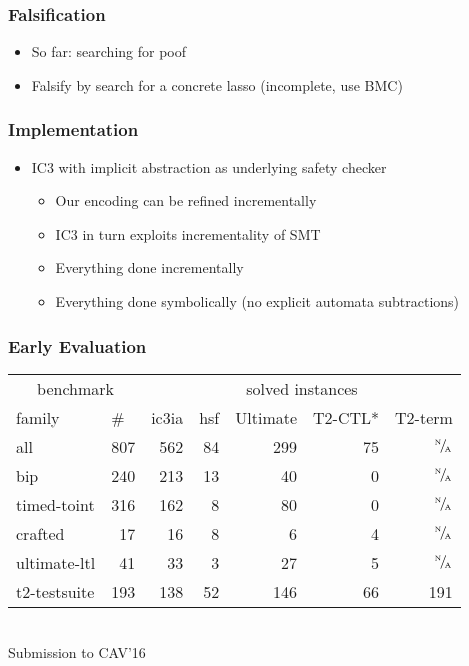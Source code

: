 \documentclass[d3s,tikz]{beamer}
\begin{document}
\subtitleframe{}
\begin{frame}
\frametitle{Falsification}
\begin{itemize}
\item So far: searching for poof
\item Falsify by search for a concrete lasso (incomplete, use BMC)
\end{itemize}
\end{frame}
\subtitleframe{}
\begin{frame}
\frametitle{Implementation}
\begin{itemize}
\item IC3 with implicit abstraction as underlying safety checker
\begin{itemize}
\item Our encoding can be refined incrementally
\item IC3 in turn exploits incrementality of SMT
\item Everything done incrementally
\item Everything done symbolically (no explicit automata subtractions)
\end{itemize}
\end{itemize}
\end{frame}
\subtitleframe{}
\begin{frame}
\frametitle{Early Evaluation}
\centering
\def\us{\cellcolor{blue!100}}
\def\na{\color{darkgray}$^\text{\tiny N}\!/\!_\text{\tiny A}$}
\def\sum{\cellcolor{gray}}
\begin{tabular}{lr | r r r r r}
\multicolumn{2}{c|}{benchmark} & \multicolumn{5}{c}{solved instances} \\
\multicolumn{1}{l}{family} & \multicolumn{1}{l|}{\#} & \multicolumn{1}{l}{\us ic3ia} & \multicolumn{1}{l}{hsf} & \multicolumn{1}{l}{Ultimate} & \multicolumn{1}{l}{T2-CTL*} & \multicolumn{1}{l}{T2-term} \\
\sum all & \sum 807 & \us 562 & \sum 84 & \sum 299 & \sum 75 & \sum \na \\
bip          & 240 & \us 213 & 13 &  40 &  0 & \na \\
timed-toint  & 316 & \us 162 &  8 &  80 &  0 & \na \\
crafted      &  17 & \us  16 &  8 &   6 &  4 & \na \\
ultimate-ltl &  41 & \us  33 &  3 &  27 &  5 & \na \\
t2-testsuite & 193 & \us 138 & 52 & 146 & 66 & 191 \\
\end{tabular} \\
\vskip1cm
Submission to CAV'16
\end{frame}
\end{document}
